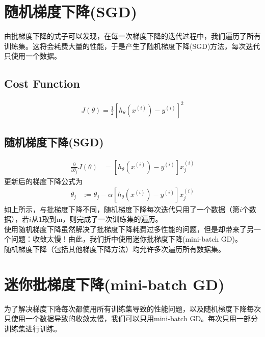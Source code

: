 \section{随机梯度下降(SGD)}
由批梯度下降的式子可以发现，在每一次梯度下降的迭代过程中，我们遍历了所有训练集。这将会耗费大量的性能，于是产生了随机梯度下降(SGD)方法，每次迭代只使用一个数据。 \\
\subsection{Cost Function}
\begin{equation}\begin{aligned}
	J(\theta) = \frac{1}{2} \left[h_{\theta} {(x^{(i)})} - y^{(i)}\right]^2
\end{aligned}\end{equation}

\subsection{随机梯度下降(SGD)}
\begin{equation}\begin{aligned}
      \frac{\partial} {\partial \theta_j} J(\theta) &= \left[ h_\theta(x^{(i)}) - y^{(i)} \right]x_j^{(i)}
\end{aligned}\end{equation}
更新后的梯度下降公式为
\begin{equation}\begin{aligned}
	\theta_j &:= \theta_j - \alpha\left[ h_\theta(x^{(i)}) - y^{(i)} \right]x_j^{(i)}
\end{aligned}\end{equation}
如上所示，与批梯度下降不同，随机梯度下降每次迭代只用了一个数据（第$i$个数据），若$i$从1取到m，则完成了一次训练集的遍历。\\
使用随机梯度下降虽然解决了批梯度下降耗费过多性能的问题，但是却带来了另一个问题：收敛太慢！由此，我们折中使用迷你批梯度下降(mini-batch GD)。\\
随机梯度下降（包括其他梯度下降方法）均允许多次遍历所有数据集。

\section{迷你批梯度下降(mini-batch GD)}
为了解决梯度下降每次都使用所有训练集导致的性能问题，以及随机梯度下降每次只使用一个数据导致的收敛太慢，我们可以只用mini-batch GD。每次只用一部分训练集进行训练。











